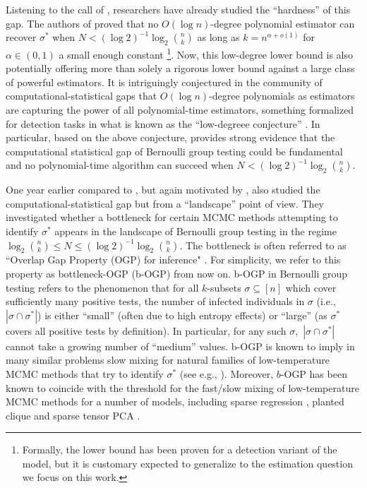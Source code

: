 \documentclass[12pt,reqno]{amsart}
\numberwithin{equation}{section}
\theoremstyle{definition}
\renewcommand{\[}{\begin{equation}}
\renewcommand{\]}{\end{equation}}
\renewcommand{\|}{\bigg{|}}
\begin{document}
Listening to the call of \cite[Open Problem 3]{Aldridge_2019}, researchers have already studied the ``hardness'' of this gap. The authors of \cite{cojaoghlan2022statistical} proved that no $O(\log n)$-degree polynomial estimator can recover $\sigma^*$ when $N <(\log 2)^{-1} \log_2 \binom{n}{k}$ as long as $k=n^{\alpha+o(1)}$ for $\alpha \in (0,1)$ a small enough constant \footnote{Formally, the lower bound has been proven for a detection variant of the model, but it is customary expected to generalize to the estimation question we focus on this work.}. Now, this low-degree lower bound is also potentially offering more than solely a rigorous lower bound against a large class of powerful estimators. It is intriguingly conjectured in the community of computational-statistical gaps that $O(\log n)$-degree polynomials as estimators are capturing the power of all polynomial-time estimators, something formalized for detection tasks in what is known as the ``low-degreee conjecture'' \cite{sam-thesis}. In particular, based on the above conjecture, \cite{cojaoghlan2022statistical} provides strong evidence that the computational statistical gap of Bernoulli group testing could be fundamental and no polynomial-time algorithm can succeed when $N <(\log 2)^{-1} \log_2 \binom{n}{k}.$

One year earlier compared to \cite{cojaoghlan2022statistical}, but again motivated by \cite[Open Problem 3]{Aldridge_2019}, \cite{iliopoulos2021group} also studied the computational-statistical gap but from a ``landscape'' point of view. They investigated whether a bottleneck for certain MCMC methods attempting to identify $\sigma^*$ appears in the landscape of Bernoulli group testing in the regime $\log_2 \binom{n}{k} \leq N \leq (\log 2)^{-1} \log_2 \binom{n}{k}$. The bottleneck is often referred to as ``Overlap Gap Property (OGP) for inference" \cite{gamarnik2022sparse}. For simplicity, we refer to this property as bottleneck-OGP (b-OGP) from now on. b-OGP in Bernoulli group testing refers to the phenomenon that for all $k$-subsets $\sigma \subseteq [n]$ which cover sufficiently many positive tests, the number of infected individuals in $\sigma$ (i.e., $|\sigma \cap \sigma^*|$) is either ``small'' (often due to high entropy effects) or ``large'' (as $\sigma^*$ covers all positive tests by definition). In particular, for any such $\sigma,$ $|\sigma \cap \sigma^*|$ cannot take a growing number of ``medium'' values. b-OGP is known to imply in many similar problems slow mixing for natural families of low-temperature MCMC methods that try to identify $\sigma^*$ (see e.g., \cite{gamarnik2021overlap, gamarnik2022sparse, arous2023free, gamarnik2024overlap, chen2023almost, chen2024low}). Moreover, $b$-OGP has been known to coincide with the threshold for the fast/slow mixing of low-temperature MCMC methods for a number of models, including sparse regression \cite{gamarnik2022sparse, chen2024low}, planted clique \cite{gamarnik2024overlap} and sparse tensor PCA \cite{chen2024low}.
\end{document}
